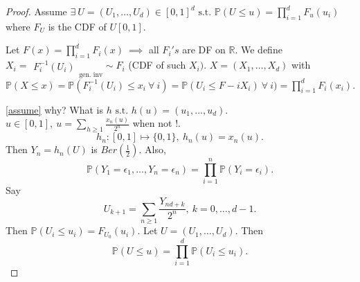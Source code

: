 \documentclass{article}
\newcommand{\1}{\mathds{1}}
\newcommand{\R}{\mathbb{R}}
\newcommand{\PB}{\mathbb{P}}
\newcommand{\lf}{\left}
\newcommand{\rg}{\right}
\newcommand{\f}[2]{\frac{#1}{#2}}
\newcommand{\st}{\text{ s.t. }}
\newcommand{\fb}[1]{\lf(#1\rg)}
\begin{document}
\begin{proof}
    \label{assume} Assume $\exists\ U=(U_1,\ldots,U_d)\in [0,1]^d\st \PB(U\leq u)=\prod_{i=1}^d F_u(u_i)$ where $F_{U}$ is the CDF of $U[0,1].$ 
    
    Let $F(x)=\prod_{i=1}^d F_i(x)\ \implies$ all $F_i's$ are DF on $\R.$ We define $X_i=\substack{F_i^{-1}(U_i)}_{\text{gen. inv}}\sim F_i$ (CDF of such $X_i).$ $X=(X_1,\ldots, X_d)$ with $\PB(X\leq x)=\PB(F_i^{-1}(U_i)\leq x_i\ \forall\ i)=\PB(U_i\leq F-iX_i)\ \forall\ i)=\prod_{i=1}^d F_i(x_i).$

    \ref{assume} why? What is $h\st h(u)=(u_1,\ldots,u_d).$ $u\in [0,1],\ u=\sum_{h\geq 1}\f{x_n(u)}{2^n}$ when not $!.$ $$h_n:[0,1]\mapsto \{0,1\},\ h_n(u)=x_n(u).$$ Then $Y_n=h_n(U)$ is $Ber\fb{\f12}.$ Also, $$\PB(Y_1=\epsilon_1,\ldots,Y_n=\epsilon_n)=\prod_{i=1}^n\PB(Y_i=\epsilon_i).$$ Say $$U_{k+1}=\sum_{n\geq 1}\f {Y_{nd+k}}{2^n},\ k=0,\ldots,d-1.$$ Then $\PB(U_i\leq u_i)=F_{U_0}(u_i).$ Let $U=(U_1,\ldots,U_d).$ Then $$\PB(U\le u)=\prod_{i=1}^d\PB(U_i\leq u_i).$$
    \end{proof}
\end{document}
